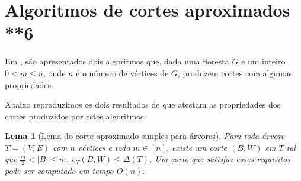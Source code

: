 \documentclass[a4paper,12pt]{article}
\newtheorem{lem}{Lema}
\begin{document}
\section {Algoritmos de cortes aproximados **6}

Em \cite{Schmidt15}, são apresentados dois algoritmos que, dada uma 
floresta $G$ e um inteiro $0<m\le n$, onde $n$ é o número de vértices 
de $G$, produzem cortes com algumas propriedades.

Abaixo reproduzimos os dois resultados de \cite{Schmidt15} que 
atestam as propriedades dos cortes produzidos por estes algoritmos:

\bigskip
\bigskip
\bigskip
\bigskip

\begin{lem}[Lema do corte aproximado simples para árvores]

	Para toda árvore $T=(V,E)$ com $n$ vértices e todo $m \in [n]$,
	existe um corte $(B,W)$ em $T$ tal que 
	$\frac{m}{2} <|B| \le m$,
	$e_T(B,W) \le \Delta(T)$.
	Um corte que satisfaz esses requisitos pode ser computado em
	tempo $O(n)$.
\end{lem}

\medskip
\end{document}
